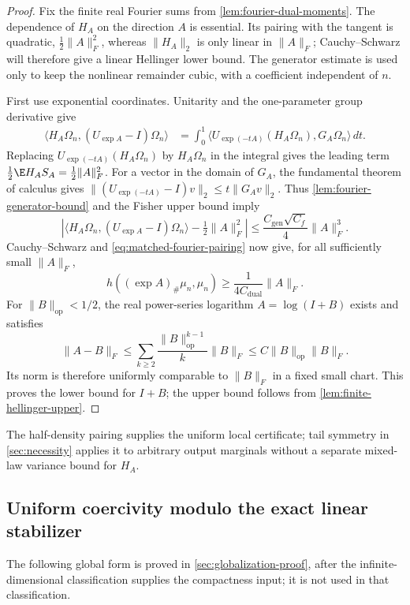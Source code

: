 \begin{proof}
Fix the finite real Fourier sums from \cref{lem:fourier-dual-moments}.
The dependence of \(H_A\) on the direction \(A\) is essential.  Its pairing
with the tangent is quadratic, \(\frac12\|A\|_F^2\), whereas
\(\|H_A\|_2\) is only linear in \(\|A\|_F\); Cauchy--Schwarz will therefore
give a linear Hellinger lower bound.  The generator estimate is used only to
keep the nonlinear remainder cubic, with a coefficient independent of \(n\).

First use exponential coordinates.  Unitarity and the
one-parameter group derivative give
\begin{align*}
 \langle H_A\Omega_n,(U_{\exp A}-I)\Omega_n\rangle
 &=\int_0^1
   \langle U_{\exp(-tA)}(H_A\Omega_n),G_A\Omega_n\rangle\,dt.
\end{align*}
Replacing $U_{\exp(-tA)}(H_A\Omega_n)$ by $H_A\Omega_n$ in the integral
gives the leading term $\tfrac12\E H_AS_A=\tfrac12\|A\|_F^2$.
For a vector in the domain of $G_A$, the fundamental theorem of
calculus gives
$\|(U_{\exp(-tA)}-I)v\|_2\le t\|G_Av\|_2$.
Thus \cref{lem:fourier-generator-bound} and the Fisher upper
bound imply
\[
 \left|\langle H_A\Omega_n,(U_{\exp A}-I)\Omega_n\rangle
                       -\tfrac12\|A\|_F^2\right|
 \le\frac{C_{\mathrm{gen}}\sqrt{C_f}}4\|A\|_F^3.
\]
Cauchy--Schwarz and \eqref{eq:matched-fourier-pairing} now
give, for all sufficiently small $\|A\|_F$,
\[
 h((\exp A)_\#\mu_n,\mu_n)
 \ge\frac{1}{4C_{\mathrm{dual}}}\|A\|_F.
\]
For $\|B\|_{\mathrm{op}}<1/2$, the real power-series logarithm
$A=\log(I+B)$ exists and satisfies
\[
 \|A-B\|_F
 \le\sum_{k\ge2}\frac{\|B\|_{\mathrm{op}}^{k-1}}{k}\|B\|_F
 \le C\|B\|_{\mathrm{op}}\|B\|_F.
\]
Its norm is therefore uniformly comparable to $\|B\|_F$ in a
fixed small chart.  This proves the lower bound for $I+B$;
the upper bound follows from
\cref{lem:finite-hellinger-upper}.
\end{proof}

The half-density pairing supplies the uniform local certificate; tail symmetry
in \cref{sec:necessity} applies it to arbitrary output marginals without a
separate mixed-law variance bound for \(H_A\).

\subsection{Uniform coercivity modulo the exact linear stabilizer}
\label{sec:global-coercivity}

The following global form is proved in \cref{sec:globalization-proof}, after
the infinite-dimensional classification supplies the compactness input; it is
not used in that classification.

